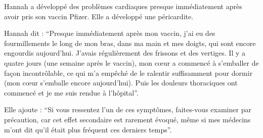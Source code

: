Hannah a développé des problèmes cardiaques presque immédiatement après avoir
pris son vaccin Pfizer. Elle a développé une péricardite.

Hannah dit : “Presque immédiatement après mon vaccin, j'ai eu des fourmillements
le long de mon bras, dans ma main et mes doigts, qui sont encore engourdis
aujourd'hui. J'avais régulièrement des frissons et des vertiges. Il y a quatre
jours (une semaine après le vaccin), mon cœur a commencé à s'emballer de façon
incontrôlable, ce qui m'a empêché de le ralentir suffisamment pour dormir (mon
cœur s'emballe encore aujourd'hui). Puis les douleurs thoraciques ont commencé
et je me suis rendue à l'hôpital”.

Elle ajoute : “Si vous ressentez l'un de ces symptômes, faites-vous examiner par
précaution, car cet effet secondaire est rarement évoqué, même si mes médecins
m'ont dit qu'il était plus fréquent ces derniers temps”.

